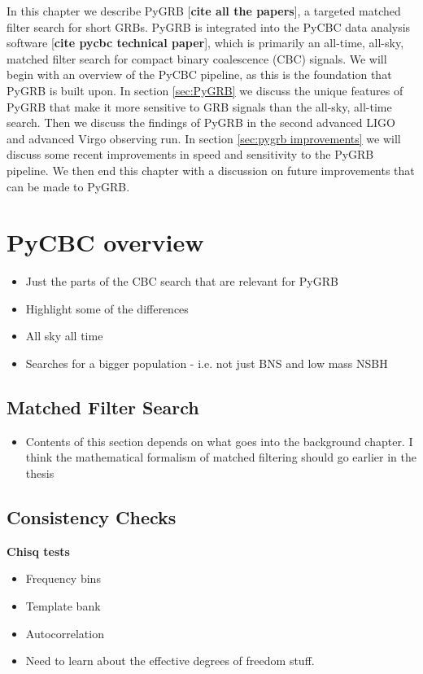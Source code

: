\documentclass[11pt]{cuthesis}
\begin{document}
In this chapter we describe PyGRB [\textbf{cite all the papers}], a targeted matched filter search for short GRBs. PyGRB is integrated into the PyCBC data analysis software [\textbf{cite pycbc technical paper}], which is primarily an all-time, all-sky, matched filter search for compact binary coalescence (CBC) signals. We will begin with an overview of the PyCBC pipeline, as this is the foundation that PyGRB is built upon. In section \ref{sec:PyGRB} we discuss the unique features of PyGRB that make it more sensitive to GRB signals than the all-sky, all-time search. Then we discuss the findings of PyGRB in the second advanced LIGO and advanced Virgo observing run. In section \ref{sec:pygrb improvements} we will discuss some recent improvements in speed and sensitivity to the PyGRB pipeline. We then end this chapter with a discussion on future improvements that can be made to PyGRB. 

\section{PyCBC overview}
\begin{itemize}
\item Just the parts of the CBC search that are relevant for PyGRB
\item Highlight some of the differences
\item All sky all time
\item Searches for a bigger population - i.e. not just BNS and low mass NSBH
\end{itemize}
\subsection{Matched Filter Search}
\begin{itemize}
\item Contents of this section depends on what goes into the background chapter. I think the mathematical formalism of matched filtering should go earlier in the thesis
\end{itemize}

\subsection{Consistency Checks} \label{sec:chi2}
\textbf{Chisq tests}
\begin{itemize}
\item Frequency bins
\item Template bank
\item Autocorrelation 
\item Need to learn about the effective degrees of freedom stuff. 
\end{itemize}
\end{document}
